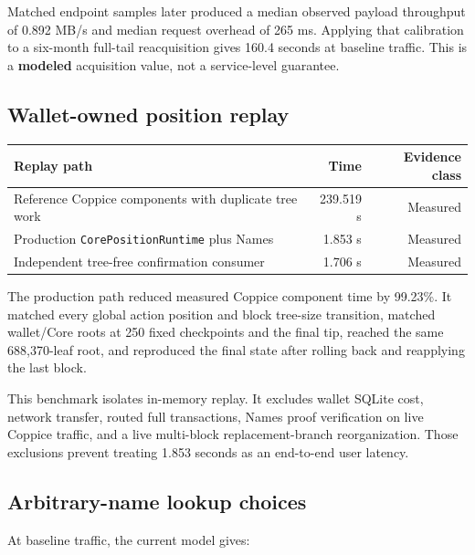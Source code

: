 \documentclass[11pt]{article}
\newcommand{\statusword}[1]{\textbf{#1}}
\newcommand{\code}[1]{\texttt{#1}}
\begin{document}
Matched endpoint samples later produced a median observed payload throughput
of 0.892 MB/s and median request overhead of 265 ms. Applying that
calibration to a six-month full-tail reacquisition gives 160.4 seconds at
baseline traffic. This is a \statusword{modeled} acquisition value, not a
service-level guarantee.

\subsection{Wallet-owned position replay}

\begin{center}
\small
\begin{tabular}{>{\raggedright\arraybackslash}p{}rr}
\toprule
Replay path & Time & Evidence class \\
\midrule
Reference Coppice components with duplicate tree work & 239.519 s & Measured \\
Production \code{CorePositionRuntime} plus Names & 1.853 s & Measured \\
Independent tree-free confirmation consumer & 1.706 s & Measured \\
\bottomrule
\end{tabular}
\end{center}

The production path reduced measured Coppice component time by 99.23\%. It
matched every global action position and block tree-size transition, matched
wallet/Core roots at 250 fixed checkpoints and the final tip, reached the same
688,370-leaf root, and reproduced the final state after rolling back and
reapplying the last block.

This benchmark isolates in-memory replay. It excludes wallet SQLite cost,
network transfer, routed full transactions, Names proof verification on live
Coppice traffic, and a live multi-block replacement-branch reorganization.
Those exclusions prevent treating 1.853 seconds as an end-to-end user
latency.

\subsection{Arbitrary-name lookup choices}

At baseline traffic, the current model gives:
\end{document}
